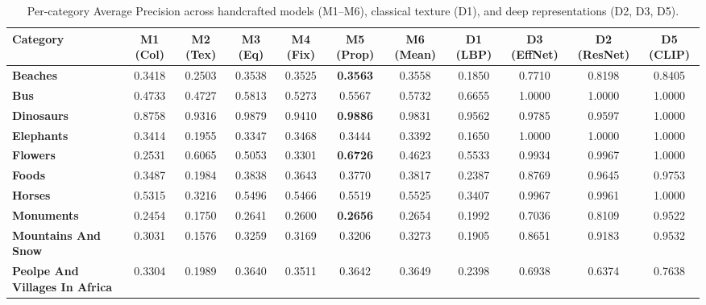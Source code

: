 \begin{table}[!t]
\centering
\caption{Per-category Average Precision across handcrafted models (M1--M6), classical texture (D1), and deep representations (D2, D3, D5).}
\label{tab:category_ap}
\begin{tabular}{lcccccccccc}
\toprule
\textbf{Category} & \textbf{M1 (Col)} & \textbf{M2 (Tex)} & \textbf{M3 (Eq)} & \textbf{M4 (Fix)} & \textbf{M5 (Prop)} & \textbf{M6 (Mean)} & \textbf{D1 (LBP)} & \textbf{D3 (EffNet)} & \textbf{D2 (ResNet)} & \textbf{D5 (CLIP)} \\
\midrule
\textbf{Beaches} & 0.3418 & 0.2503 & 0.3538 & 0.3525 & \textbf{0.3563} & 0.3558 & 0.1850 & 0.7710 & 0.8198 & 0.8405 \\
\textbf{Bus} & 0.4733 & 0.4727 & 0.5813 & 0.5273 & 0.5567 & 0.5732 & 0.6655 & 1.0000 & 1.0000 & 1.0000 \\
\textbf{Dinosaurs} & 0.8758 & 0.9316 & 0.9879 & 0.9410 & \textbf{0.9886} & 0.9831 & 0.9562 & 0.9785 & 0.9597 & 1.0000 \\
\textbf{Elephants} & 0.3414 & 0.1955 & 0.3347 & 0.3468 & 0.3444 & 0.3392 & 0.1650 & 1.0000 & 1.0000 & 1.0000 \\
\textbf{Flowers} & 0.2531 & 0.6065 & 0.5053 & 0.3301 & \textbf{0.6726} & 0.4623 & 0.5533 & 0.9934 & 0.9967 & 1.0000 \\
\textbf{Foods} & 0.3487 & 0.1984 & 0.3838 & 0.3643 & 0.3770 & 0.3817 & 0.2387 & 0.8769 & 0.9645 & 0.9753 \\
\textbf{Horses} & 0.5315 & 0.3216 & 0.5496 & 0.5466 & 0.5519 & 0.5525 & 0.3407 & 0.9967 & 0.9961 & 1.0000 \\
\textbf{Monuments} & 0.2454 & 0.1750 & 0.2641 & 0.2600 & \textbf{0.2656} & 0.2654 & 0.1992 & 0.7036 & 0.8109 & 0.9522 \\
\textbf{Mountains And Snow} & 0.3031 & 0.1576 & 0.3259 & 0.3169 & 0.3206 & 0.3273 & 0.1905 & 0.8651 & 0.9183 & 0.9532 \\
\textbf{Peolpe And Villages In Africa} & 0.3304 & 0.1989 & 0.3640 & 0.3511 & 0.3642 & 0.3649 & 0.2398 & 0.6938 & 0.6374 & 0.7638 \\
\bottomrule
\end{tabular}
\end{table}